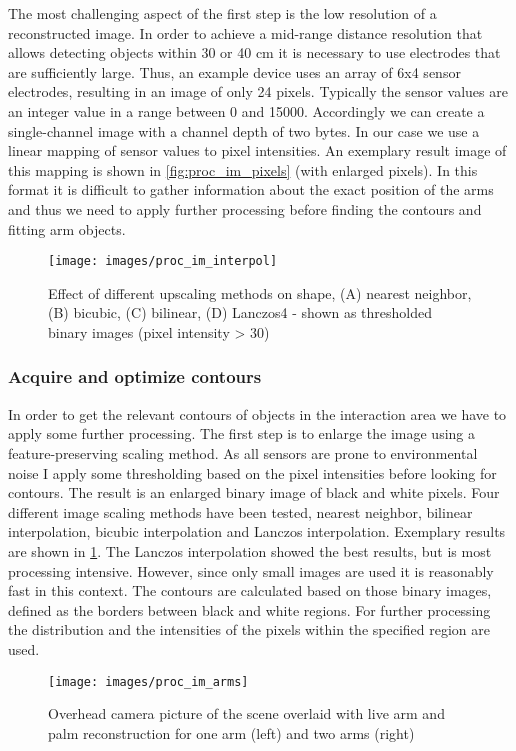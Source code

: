 The most challenging aspect of the first step is the low resolution of a reconstructed image. In order to achieve a mid-range distance resolution that allows detecting objects within 30 or 40 cm it is necessary to use electrodes that are sufficiently large. Thus, an example device uses an array of 6x4 sensor electrodes, resulting in an image of only 24 pixels. Typically the sensor values are an integer value in a range between 0 and 15000. Accordingly we can create a single-channel image with a channel depth of two bytes. In our case we use a linear mapping of sensor values to pixel intensities. An exemplary result image of this mapping is shown in \ref{fig:proc_im_pixels} (with enlarged pixels). In this format it is difficult to gather information about the exact position of the arms and thus we need to apply further processing before finding the contours and fitting arm objects.
\begin{figure}[h]
\centering
\texttt{[image: images/proc\_im\_interpol]}
\caption{Effect of different upscaling methods on shape, (A) nearest neighbor, (B) bicubic, (C) bilinear, (D) Lanczos4 - shown as thresholded binary images (pixel intensity > 30)}
\label{fig:proc_im_interpol}
\end{figure}

\subsubsection{Acquire and optimize contours}
In order to get the relevant contours of objects in the interaction area we have to apply some further processing. The first step is to enlarge the image using a feature-preserving scaling method. As all sensors are prone to environmental noise I apply some thresholding based on the pixel intensities before looking for contours. The result is an enlarged binary image of black and white pixels. Four different image scaling methods have been tested, nearest neighbor, bilinear interpolation, bicubic interpolation and Lanczos interpolation. Exemplary results are shown in \ref{fig:proc_im_interpol}. The Lanczos interpolation showed the best results, but is most processing intensive. However, since only small images are used it is reasonably fast in this context. The contours are calculated based on those binary images, defined as the borders between black and white regions. For further processing the distribution and the intensities of the pixels within the specified region are used.
\begin{figure}[h]
\centering
\texttt{[image: images/proc\_im\_arms]}
\caption{Overhead camera picture of the scene overlaid with live arm and palm reconstruction for one arm (left) and two arms (right)}
\label{fig:proc_im_arms}
\end{figure}

